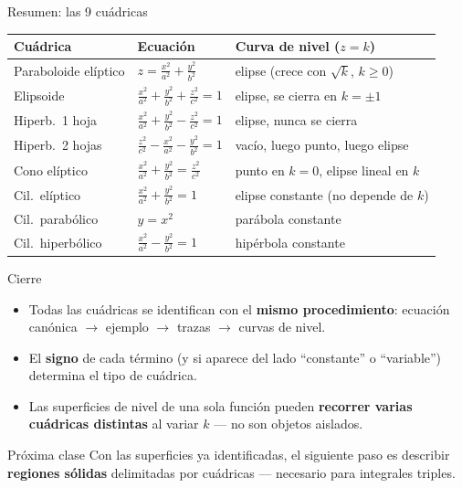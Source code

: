 \documentclass[11pt,aspectratio=169]{beamer}
\begin{document}
\begin{frame}{Resumen: las 9 cuádricas}
  \footnotesize
  \begin{center}
  \renewcommand{\arraystretch}{1.35}
  \begin{tabular}{p{2.7cm}p{4.4cm}p{4.6cm}}
    \toprule
    \textbf{Cuádrica} & \textbf{Ecuación} & \textbf{Curva de nivel ($z=k$)} \\
    \midrule
    Paraboloide elíptico & $z=\frac{x^2}{a^2}+\frac{y^2}{b^2}$ & elipse (crece con $\sqrt{k}$, $k\ge0$) \\
    Elipsoide & $\frac{x^2}{a^2}+\frac{y^2}{b^2}+\frac{z^2}{c^2}=1$ & elipse, se cierra en $k=\pm1$ \\
    Hiperb.\ 1 hoja & $\frac{x^2}{a^2}+\frac{y^2}{b^2}-\frac{z^2}{c^2}=1$ & elipse, nunca se cierra \\
    Hiperb.\ 2 hojas & $\frac{z^2}{c^2}-\frac{x^2}{a^2}-\frac{y^2}{b^2}=1$ & vacío, luego punto, luego elipse \\
    Cono elíptico & $\frac{x^2}{a^2}+\frac{y^2}{b^2}=\frac{z^2}{c^2}$ & punto en $k=0$, elipse lineal en $k$ \\
    Cil.\ elíptico & $\frac{x^2}{a^2}+\frac{y^2}{b^2}=1$ & elipse constante (no depende de $k$) \\
    Cil.\ parabólico & $y=x^2$ & parábola constante \\
    Cil.\ hiperbólico & $\frac{x^2}{a^2}-\frac{y^2}{b^2}=1$ & hipérbola constante \\
    \bottomrule
  \end{tabular}
  \end{center}
\end{frame}

\begin{frame}{Cierre}
  \begin{itemize}
    \item Todas las cuádricas se identifican con el \textbf{mismo procedimiento}: ecuación canónica $\to$ ejemplo $\to$ trazas $\to$ curvas de nivel.
    \pause
    \item El \textbf{signo} de cada término (y si aparece del lado ``constante'' o ``variable'') determina el tipo de cuádrica.
    \pause
    \item Las superficies de nivel de una sola función pueden \textbf{recorrer varias cuádricas distintas} al variar $k$ --- no son objetos aislados.
  \end{itemize}
  \vspace{10pt}
  \pause
  \begin{block}{Próxima clase}
    Con las superficies ya identificadas, el siguiente paso es describir \textbf{regiones sólidas} delimitadas por cuádricas --- necesario para integrales triples.
  \end{block}
\end{frame}
\end{document}
